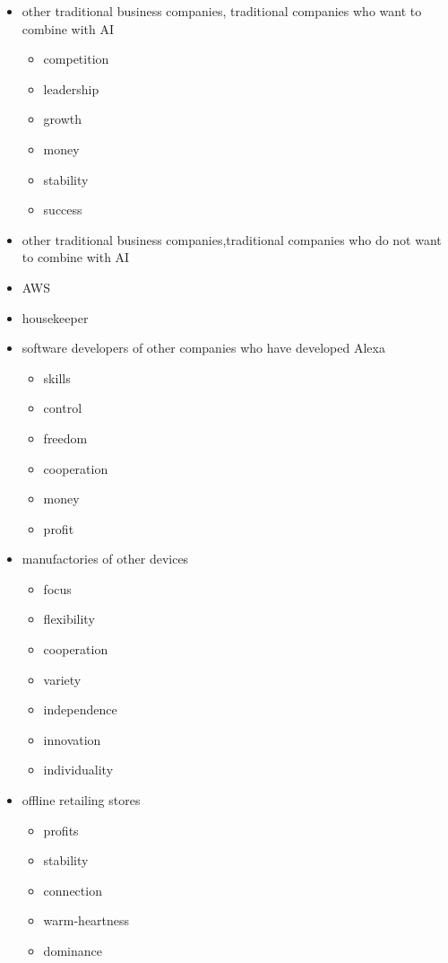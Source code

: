 \documentclass{article}
\begin{document}
\begin{itemize}
\item other traditional business companies, traditional companies who want to combine with AI
\begin{itemize}
    \item competition
    \item leadership
    \item growth
    \item money
    \item stability
    \item success
\end{itemize}

\item other traditional business companies,traditional companies who do not want to combine with AI

\item AWS

\item housekeeper

\item software developers of other companies who have developed Alexa
\begin{itemize}
    \item skills
    \item control
    \item freedom
    \item cooperation
    \item money
    \item profit
\end{itemize}

\item manufactories of other devices
\begin{itemize}
    \item focus
    \item flexibility
    \item cooperation
    \item variety
    \item independence
    \item innovation
    \item individuality
\end{itemize}

\item offline retailing stores
\begin{itemize}
    \item profits
    \item stability
    \item connection
    \item warm-heartness
    \item dominance
\end{itemize}
\end{itemize}
\end{document}
